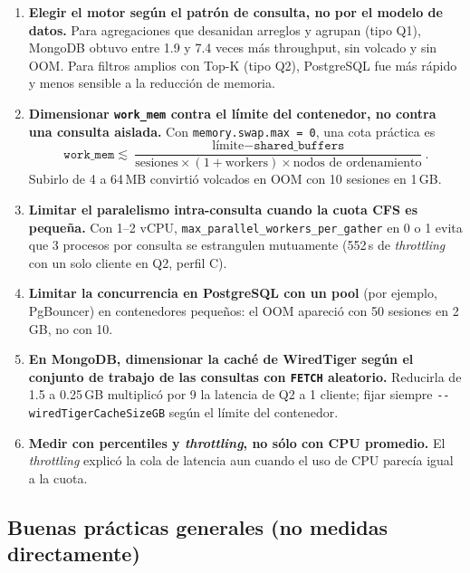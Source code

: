 \documentclass[11pt,a4paper]{article}
\begin{document}
\begin{enumerate}
  \item \textbf{Elegir el motor según el patrón de consulta, no por el modelo de datos.} Para agregaciones que desanidan arreglos y agrupan (tipo Q1), MongoDB obtuvo entre 1.9 y 7.4 veces más throughput, sin volcado y sin OOM. Para filtros amplios con Top-K (tipo Q2), PostgreSQL fue más rápido y menos sensible a la reducción de memoria.
  \item \textbf{Dimensionar \texttt{work\_mem} contra el límite del contenedor, no contra una consulta aislada.} Con \texttt{memory.swap.max = 0}, una cota práctica es
  \[\texttt{work\_mem} \lesssim \frac{\text{límite} - \texttt{shared\_buffers}}{\text{sesiones} \times (1 + \text{workers}) \times \text{nodos de ordenamiento}}.\] Subirlo de 4 a 64\,MB convirtió volcados en OOM con 10 sesiones en 1\,GB.
  \item \textbf{Limitar el paralelismo intra-consulta cuando la cuota CFS es pequeña.} Con 1--2 vCPU, \texttt{max\_parallel\_workers\_per\_gather} en 0 o 1 evita que 3 procesos por consulta se estrangulen mutuamente (552\,s de \emph{throttling} con un solo cliente en Q2, perfil C).
  \item \textbf{Limitar la concurrencia en PostgreSQL con un pool} (por ejemplo, PgBouncer) en contenedores pequeños: el OOM apareció con 50 sesiones en 2\,GB, no con 10.
  \item \textbf{En MongoDB, dimensionar la caché de WiredTiger según el conjunto de trabajo de las consultas con \texttt{FETCH} aleatorio.} Reducirla de 1.5 a 0.25\,GB multiplicó por 9 la latencia de Q2 a 1 cliente; fijar siempre \texttt{-{}-wiredTigerCacheSizeGB} según el límite del contenedor.
  \item \textbf{Medir con percentiles y \emph{throttling}, no sólo con CPU promedio.} El \emph{throttling} explicó la cola de latencia aun cuando el uso de CPU parecía igual a la cuota.
\end{enumerate}

\subsection{Buenas prácticas generales (no medidas directamente)}
\end{document}
